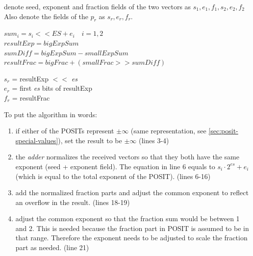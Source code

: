 \documentclass[10pt]{article}
\begin{document}
\begin{algorithm}[H]
 denote seed, exponent and fraction fields of the two vectors as
 $s_{1}, e_{1}, f_{1}, s_{2}, e_{2}, f_{2}$ \\
 Also denote the fields of the $p_{r}$ as $s_{r}, e_{r}, f_{r}$. \\

  {
   $sum_{i}= s_{i} << ES + e_{i} \quad i=1,2$ \\
   $resultExp = bigExpSum$ \\
   $sumDiff = bigExpSum - smallExpSum$ \\
   $resultFrac = bigFrac + (smallFrac >> sumDiff)$ \\

   $s_{r}$ = resultExp $<<$ \textit{es} \\
   $e_{r}$ = first \textit{es} bits of resultExp \\
   $f_{r}$ = resultFrac
    }
  \end{algorithm}

  \vspace{0.3cm}
\noindent To put the algorithm in words:
\begin{enumerate}

  \item if either of the POSITs represent $\pm \infty$ (same representation, see
  \autoref{sec:posit-special-values}), set the result to be $\pm \infty$ (lines 3-4)
  \item the \textit{adder} normalizes the received vectors so that they both
    have the same exponent (seed + exponent field). The equation in line 6  equals to
    $ s_{i} \cdot 2^{es} + e_{i}$ (which is equal to
    the total exponent of the POSIT). (lines 6-16)

  \item add the normalized fraction parts and adjust the common exponent to
  reflect an overflow in the result. (lines 18-19)
  \item adjust the common exponent so that the fraction sum would be between 1
    and 2. This is needed because the fraction part in POSIT is assumed to be in
    that range. Therefore the exponent needs to be adjusted to scale the
    fraction part as needed. (line 21)
  
  \end{enumerate}
\end{document}
